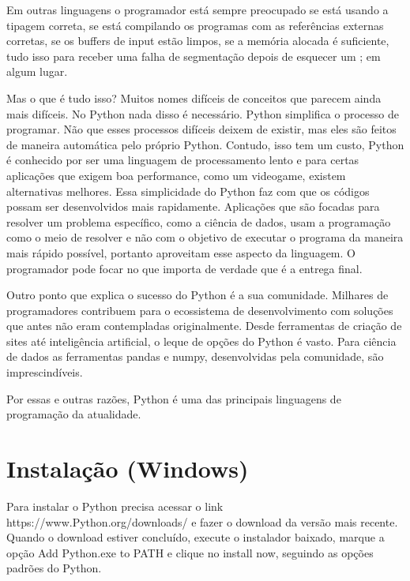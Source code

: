 \documentclass[
  letterpaper,
  DIV=11,
  numbers=noendperiod]{scrreprt}
\begin{document}
Em outras linguagens o programador está sempre preocupado se está usando
a tipagem correta, se está compilando os programas com as referências
externas corretas, se os buffers de input estão limpos, se a memória
alocada é suficiente, tudo isso para receber uma falha de segmentação
depois de esquecer um ; em algum lugar.

Mas o que é tudo isso? Muitos nomes difíceis de conceitos que parecem
ainda mais difíceis. No Python nada disso é necessário. Python
simplifica o processo de programar. Não que esses processos difíceis
deixem de existir, mas eles são feitos de maneira automática pelo
próprio Python. Contudo, isso tem um custo, Python é conhecido por ser
uma linguagem de processamento lento e para certas aplicações que exigem
boa performance, como um videogame, existem alternativas melhores. Essa
simplicidade do Python faz com que os códigos possam ser desenvolvidos
mais rapidamente. Aplicações que são focadas para resolver um problema
específico, como a ciência de dados, usam a programação como o meio de
resolver e não com o objetivo de executar o programa da maneira mais
rápido possível, portanto aproveitam esse aspecto da linguagem. O
programador pode focar no que importa de verdade que é a entrega final.

Outro ponto que explica o sucesso do Python é a sua comunidade. Milhares
de programadores contribuem para o ecossistema de desenvolvimento com
soluções que antes não eram contempladas originalmente. Desde
ferramentas de criação de sites até inteligência artificial, o leque de
opções do Python é vasto. Para ciência de dados as ferramentas pandas e
numpy, desenvolvidas pela comunidade, são imprescindíveis.

Por essas e outras razões, Python é uma das principais linguagens de
programação da atualidade.


\hypertarget{instalauxe7uxe3o-windows}{%
\chapter{Instalação (Windows)}\label{instalauxe7uxe3o-windows}}

Para instalar o Python precisa acessar o link
https://www.Python.org/downloads/ e fazer o download da versão mais
recente. Quando o download estiver concluído, execute o instalador
baixado, marque a opção Add Python.exe to PATH e clique no install now,
seguindo as opções padrões do Python.
\end{document}
